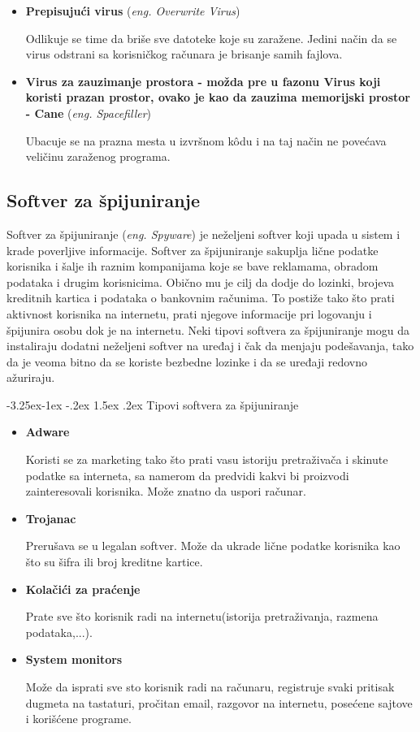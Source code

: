 \documentclass[a4paper]{article}
\makeatletter
\renewcommand\paragraph{\@startsection{paragraph}{4}{\z@}%
   {-3.25ex\@plus -1ex \@minus -.2ex}%
   {1.5ex \@plus .2ex}%
   {\normalfont\normalsize\bfseries}}
\makeatother
\begin{document}
\begin{itemize}
\item \textbf{Prepisujući virus} (\textit{eng. Overwrite Virus})

Odlikuje se time da briše sve datoteke koje su zaražene. Jedini način da se virus odstrani sa korisničkog računara je brisanje samih fajlova. 

\item \textbf{Virus za zauzimanje prostora - možda pre u fazonu Virus koji koristi prazan prostor, ovako je kao da zauzima memorijski prostor - Cane} (\textit{eng. Spacefiller})

Ubacuje se na prazna mesta u izvršnom kôdu i na taj način ne povećava veličinu zaraženog programa.

\end{itemize}


\subsection{Softver za špijuniranje}
\label{spyware}
Softver za špijuniranje (\textit{eng. Spyware}) je neželjeni softver koji upada u sistem  i krade poverljive informacije. Softver za špijuniranje sakuplja lične podatke korisnika i šalje ih raznim kompanijama koje se bave reklamama, obradom podataka i drugim korisnicima. Obično mu je cilj da dodje do lozinki, brojeva kreditnih kartica i podataka o bankovnim računima. 
To postiže tako što prati aktivnost korisnika na internetu, prati njegove informacije pri logovanju i špijunira osobu dok je na internetu. Neki tipovi softvera za špijuniranje mogu da instaliraju dodatni neželjeni softver na uređaj i čak da menjaju podešavanja, tako da je veoma bitno da se koriste bezbedne lozinke i da se uređaji redovno ažuriraju.\cite{spyware}

\paragraph{Tipovi softvera za špijuniranje}
\begin{itemize}
\item \textbf{Adware}

Koristi se za marketing tako što prati vasu istoriju pretraživača i skinute podatke sa interneta, sa 
namerom da predvidi kakvi bi proizvodi zainteresovali korisnika.
Može znatno da uspori računar.

\item \textbf{Trojanac}

Prerušava se u legalan softver. 
Može da ukrade lične podatke korisnika kao što su šifra ili broj kreditne kartice.

\item \textbf{Kolačići za praćenje}

Prate sve što korisnik radi na internetu(istorija pretraživanja, razmena podataka,...).

\item \textbf{System monitors}

Može da isprati sve sto korisnik radi na računaru,
registruje svaki pritisak dugmeta na tastaturi, pročitan email, razgovor na internetu, posećene sajtove i korišćene programe.
    
\end{itemize}   
\end{document}

